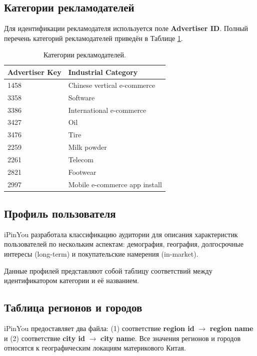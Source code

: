 \subsection{Категории рекламодателей}
Для идентификации рекламодателя используется поле \textbf{Advertiser ID}. Полный перечень категорий рекламодателей приведён в Таблице \ref{tab:advertiser_category}.

\begin{table}[h!]
\small
  \begin{center}
    \caption{Категории рекламодателей.}
    \label{tab:advertiser_category}
    \renewcommand{\arraystretch}{1.15}
    \begin{tabular}{l|l}
      \textbf{Advertiser Key} & \textbf{Industrial Category} \\
      \hline
      1458 & Chinese vertical e-commerce \\
      3358 & Software \\
      3386 & International e-commerce \\
      3427 & Oil \\
      3476 & Tire \\
      2259 & Milk powder \\
      2261 & Telecom \\
      2821 & Footwear \\
      2997 & Mobile e-commerce app install \\
    \end{tabular}
  \end{center}
\end{table}


\subsection{Профиль пользователя}
iPinYou разработала классификацию аудитории для описания характеристик пользователей по нескольким аспектам: демография, география, долгосрочные интересы (long-term) и покупательские намерения (in-market).

Данные профилей представляют собой таблицу соответствий между идентификатором категории и её названием.

\subsection{Таблица регионов и городов}
iPinYou предоставляет два файла: (1) соответствие \textbf{region id} $\rightarrow$ \textbf{region name} и (2) соответствие \textbf{city id} $\rightarrow$ \textbf{city name}. Все значения регионов и городов относятся к географическим локациям материкового Китая.
 
